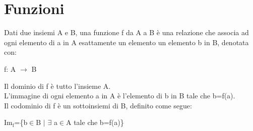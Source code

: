 \documentclass{book}
\begin{document}
    \section{Funzioni}
    Dati due insiemi A e B, una funzione f da A a B è una relazione che associa ad ogni elemento di a in A esattamente un elemento un elemento b in B, denotata con:
    \begin{center}
        f: A $\to$ B
    \end{center}
    Il dominio di f è tutto l'insieme A.\\
    L'immagine di ogni elemento a in A è l'elemento di b in B tale che b=f(a).\\
    Il codominio di f è un sottoinsiemi di B, definito come segue:
    \begin{center}
        $\text{Im}_\text{f}$=\{b$\in$B $|$ $\exists$ a$\in$A tale che b=f(a)\}
    \end{center}
\end{document}
